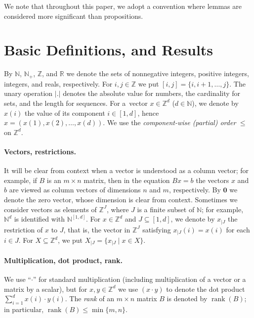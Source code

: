\documentclass[11pt,a4paper]{amsart}
\newcommand{\Nat}{\mathbb{N}}
\newcommand{\Zset}{\mathbb{Z}}
\newcommand{\restr}[1]{_{|{#1}}}
\newcommand{\setN}{\Nat}
\newcommand{\setZ}{\Zset}
\newcommand{\setR}{\mathbb{R}}
\newcommand{\scalar}[2]{(#1 \cdot #2)}
\newcommand{\rank}[1]{\operatorname{rank}(#1)}
\theoremstyle{plain}
\theoremstyle{definition}
\theoremstyle{defC}
\theoremstyle{thmC}
\begin{document}
We note that throughout this paper, we adopt a convention where lemmas are considered more significant than propositions.
\section{Basic Definitions, and Results}\label{sec:basicdef}
By $\setN$, $\setN_+$, $\setZ$, and $\setR$ we denote the sets of nonnegative
integers, positive integers, integers, and reals, respectively.
For $i,j\in\setZ$ we put $[i,j]=\{i,i{+}1,\dots,j\}$.
The unary operation $|.|$ denotes the absolute value for numbers, the
cardinality for sets, and the length for sequences.
For a~vector $x\in\setZ^d$ ($d\in\setN$), we denote by $x(i)$ the value of its
component $i\in[1,d]$, 
hence $x=(x(1),x(2),\ldots,x(d))$. 
We use the \emph{component-wise (partial) order} $\leq$ on $\setZ^d$.


\paragraph{Vectors, restrictions.}
It will be clear from context when a vector is understood as a column vector; for example, if $B$ is an $m\times n$ matrix, then in the equation $Bx=b$ the vectors $x$ and $b$ are viewed as column vectors of dimensions $n$ and $m$, respectively. By $\mathbf{0}$ we denote the zero vector, whose dimension is clear from context.
Sometimes we consider vectors as elements of $\setZ^J$, where $J$ is a finite subset of $\setN$; for example, $\setN^d$ is identified with $\setN^{[1,d]}$.
For $x\in \setZ^d$ and $J\subseteq[1,d]$, we denote by $x\restr{J}$
the restriction of $x$ to $J$, that is, the vector in $\setZ^J$
satisfying $x\restr{J}(i)=x(i)$ for each $i\in J$. For
$X\subseteq\setZ^d$, we put $X\restr{J}=\{x\restr{J}\mid x\in X\}$.

\paragraph{Multiplication, dot product, rank.}
We use “$\cdot$” for standard multiplication (including multiplication of a vector or a matrix by a scalar), but for $x,y\in\setZ^d$ we use $\scalar{x}{y}$ to denote the dot product $\sum_{i=1}^d x(i)\cdot y(i)$.
The \emph{rank} of an $m\times n$ matrix $B$ is denoted by $\rank{B}$;
in particular, $\rank{B}\leq\min\{m,n\}$.
\end{document}
